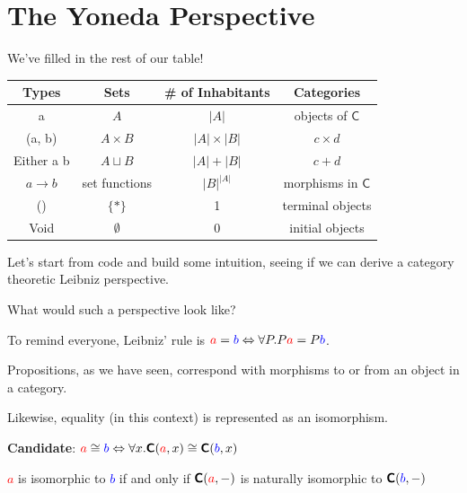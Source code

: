 \documentclass[tikz]{beamer}
\newcommand{\cat}[1]{\bm{ \mathsf{#1} }}
\newcommand{\cc}{\cat{C}}
\newcommand{\red}[1]{\textcolor{red}{#1}}
\newcommand{\mred}[1]{\textcolor{red}{$#1$}}
\newcommand{\blue}[1]{\textcolor{blue}{#1}}
\newcommand{\mblue}[1]{\textcolor{blue}{$#1$}}
\theoremstyle{definition}
\begin{document}
\section{The Yoneda Perspective}


\begin{frame}
	We've filled in the rest of our table! 	
	
	\begin{center}
		\begin{tabular}{|c|c|c|c|}
		\hline
		Types & Sets & \# of Inhabitants & Categories \\
		\hline
			a       & $A$ & $|A|$  & objects of $\cc$ \\
			(a, b) & $A \times B$ & $|A| \times |B|$ & $c \times d$ \\
			Either a b & $A \sqcup B$ & $|A| + |B|$ & $c + d$ \\
			$a \to b$ &  set functions & $|B|^{|A|}$ & morphisms in $\cc$ \\
			() & $\{*\}$ & 1 & terminal objects \\
			Void & $\emptyset$ & 0 & initial objects \\ \hline
		\end{tabular}
	\end{center}
\end{frame}

\frame
{
	Let's start from code and build some intuition, seeing if we can derive a category theoretic Leibniz perspective. 
}

\frame
{
	What would such a perspective look like? 
}

\frame
{
	To remind everyone, Leibniz' rule is $ \red{a} = \blue{b} \Leftrightarrow \forall P. P \red{a} = P \blue{b}$. 
}

\frame
{
	Propositions, as we have seen, correspond with morphisms to or from an object in a category. 
	
	Likewise, equality (in this context) is represented as an isomorphism. 
}

\frame
{
	\textbf{Candidate}: $\red{a} \cong \blue{b} \Leftrightarrow \forall x. \cc(\red{a}, x) \cong \cc(\blue{b}, x)$
}

\frame
{
	\begin{definition}
		\mred{a} is isomorphic to \mblue{b} if and only if $\cc(\red{a}, -)$ is naturally isomorphic to  $\cc(\blue{b}, -)$
	\end{definition}
	
}
\end{document}
